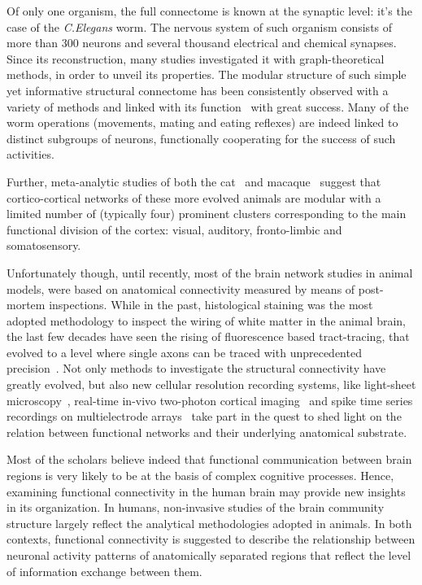 Of only one organism, the full connectome is known at the synaptic level: it's the case of the \emph{C.Elegans} worm. The nervous system of such organism consists of more than 300 neurons and several thousand electrical and chemical synapses. Since its reconstruction, many studies investigated it with graph-theoretical methods, in order to unveil its properties. The modular structure of such simple yet informative structural connectome has been consistently observed with a variety of methods and linked with its function~\cite{sporns2016} with great success. Many of the worm operations (movements, mating and eating reflexes) are indeed linked to distinct subgroups of neurons, functionally cooperating for the success of such activities.

Further, meta-analytic studies of both the cat~\cite{scannell1995} and macaque~\cite{felleman1991} suggest that cortico-cortical networks of these more evolved animals are modular with a limited number of (typically four) prominent clusters corresponding to the main functional division of the cortex: visual, auditory, fronto-limbic and somatosensory. 

Unfortunately though, until recently, most of the brain network studies in animal models, were based on anatomical connectivity measured by means of post-mortem inspections. While in the past, histological staining was the most adopted methodology to inspect the wiring of white matter in the animal brain, the last few decades have seen the rising of fluorescence based tract-tracing, that evolved to a level where single axons can be traced with unprecedented precision~\cite{oh2014}. Not only methods to investigate the structural connectivity have greatly evolved, but also new cellular resolution recording systems, like light-sheet microscopy~\cite{ahrens2013}, real-time in-vivo two-photon cortical imaging~\cite{dombeck2010,leinweber2014} and spike time series recordings on multielectrode arrays~\cite{shimono2015} take part in the quest to shed light on the relation between functional networks and their underlying anatomical substrate.

Most of the scholars believe indeed that functional communication between brain regions is very likely to be at the basis of complex cognitive processes.
Hence, examining functional connectivity in the human brain may provide new insights in its organization.
In humans, non-invasive studies of the brain community structure largely reflect the analytical methodologies adopted in animals.
In both contexts, functional connectivity is suggested to describe the relationship between neuronal activity patterns of anatomically separated regions that reflect the level of information exchange between them.

